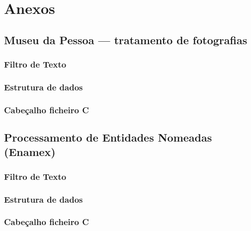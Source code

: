 \chapter{Anexos}
\label{cap:anex}


\section{Museu da Pessoa — tratamento de fotografias}
\label{seq:anex-museu}


\subsection{Filtro de Texto}
\label{seq:anex-museu-filtro}


\subsection{Estrutura de dados}
\label{seq:anex-museu-est}


\subsection{Cabeçalho ficheiro C}
\label{seq:anex-museu-header}


\section{Processamento de Entidades Nomeadas (Enamex)}
\label{seq:anex-enamex}

\subsection{Filtro de Texto}
\label{seq:anex-enamex-filtro}


\subsection{Estrutura de dados}
\label{seq:anex-enamex-est}


\subsection{Cabeçalho ficheiro C}
\label{seq:anex-enamex-header}


